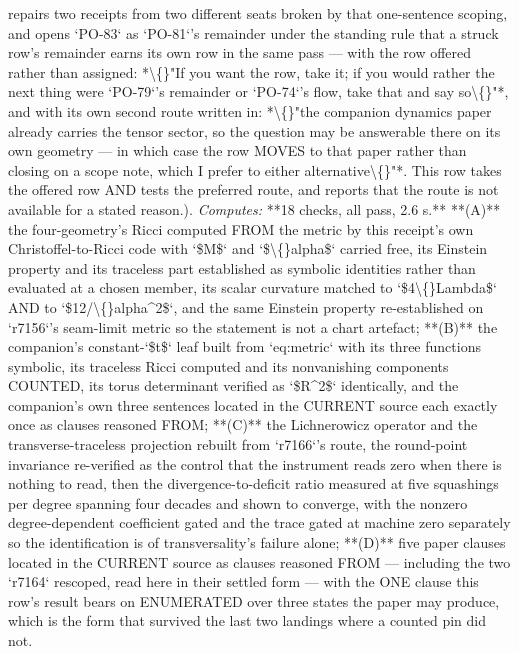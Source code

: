 \begin{description}
repairs two receipts from two different seats broken by that one-sentence scoping, and opens `PO-83` as `PO-81`'s remainder under the standing rule that a struck row's remainder earns its own row in the same pass --- with the row offered rather than assigned: *\textbackslash\{\}"If you want the row, take it; if you would rather the next thing were `PO-79`'s remainder or `PO-74`'s flow, take that and say so\textbackslash\{\}"*, and with its own second route written in: *\textbackslash\{\}"the companion dynamics paper already carries the tensor sector, so the question may be answerable there on its own geometry --- in which case the row MOVES to that paper rather than closing on a scope note, which I prefer to either alternative\textbackslash\{\}"*. This row takes the offered row AND tests the preferred route, and reports that the route is not available for a stated reason.). 
\emph{Computes:} **18 checks, all pass, 2.6 s.** **(A)** the four-geometry's Ricci computed FROM the metric by this receipt's own Christoffel-to-Ricci code with `\$M\$` and `\$\textbackslash\{\}alpha\$` carried free, its Einstein property and its traceless part established as symbolic identities rather than evaluated at a chosen member, its scalar curvature matched to `\$4\textbackslash\{\}Lambda\$` AND to `\$12/\textbackslash\{\}alpha\textasciicircum{}2\$`, and the same Einstein property re-established on `r7156`'s seam-limit metric so the statement is not a chart artefact; **(B)** the companion's constant-`\$t\$` leaf built from `eq:metric` with its three functions symbolic, its traceless Ricci computed and its nonvanishing components COUNTED, its torus determinant verified as `\$R\textasciicircum{}2\$` identically, and the companion's own three sentences located in the CURRENT source each exactly once as clauses reasoned FROM; **(C)** the Lichnerowicz operator and the transverse-traceless projection rebuilt from `r7166`'s route, the round-point invariance re-verified as the control that the instrument reads zero when there is nothing to read, then the divergence-to-deficit ratio measured at five squashings per degree spanning four decades and shown to converge, with the nonzero degree-dependent coefficient gated and the trace gated at machine zero separately so the identification is of transversality's failure alone; **(D)** five paper clauses located in the CURRENT source as clauses reasoned FROM --- including the two `r7164` rescoped, read here in their settled form --- with the ONE clause this row's result bears on ENUMERATED over three states the paper may produce, which is the form that survived the last two landings where a counted pin did not.

\end{description}
